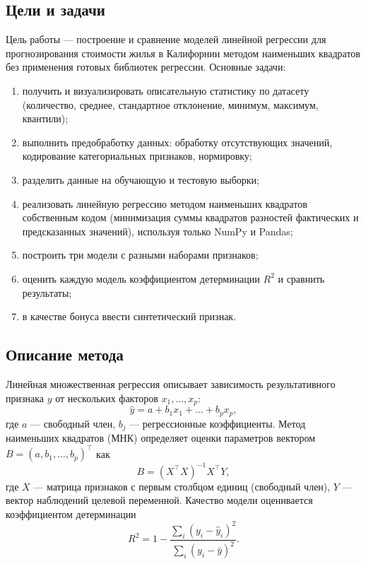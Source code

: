 \documentclass[12pt,a4paper]{article}
\begin{document}
\subsection{Цели и задачи}
Цель работы --- построение и сравнение моделей линейной регрессии для прогнозирования стоимости жилья в Калифорнии методом наименьших квадратов без применения готовых библиотек регрессии. Основные задачи:
\begin{enumerate}
\item получить и визуализировать описательную статистику по датасету (количество, среднее, стандартное отклонение, минимум, максимум, квантили);
\item выполнить предобработку данных: обработку отсутствующих значений, кодирование категориальных признаков, нормировку;
\item разделить данные на обучающую и тестовую выборки;
\item реализовать линейную регрессию методом наименьших квадратов собственным кодом (минимизация суммы квадратов разностей фактических и предсказанных значений), используя только NumPy и Pandas;
\item построить три модели с разными наборами признаков;
\item оценить каждую модель коэффициентом детерминации $R^2$ и сравнить результаты;
\item в качестве бонуса ввести синтетический признак.
\end{enumerate}

\subsection{Описание метода}
Линейная множественная регрессия описывает зависимость результативного признака $y$ от нескольких факторов $x_1,\dots,x_p$:
\begin{equation}
\hat{y} = a + b_1 x_1 + \dots + b_p x_p ,
\end{equation}
где $a$ --- свободный член, $b_j$ --- регрессионные коэффициенты. Метод наименьших квадратов (МНК) определяет оценки параметров вектором $B = (a,b_1,\dots,b_p)^\top$ как
\begin{equation}
B = (X^\top X)^{-1} X^\top Y ,
\end{equation}
где $X$ --- матрица признаков с первым столбцом единиц (свободный член), $Y$ --- вектор наблюдений целевой переменной. Качество модели оценивается коэффициентом детерминации
\begin{equation}
R^2 = 1 - \frac{\sum_i (y_i - \hat{y}_i)^2}{\sum_i (y_i - \bar{y})^2} .
\end{equation}
\end{document}
